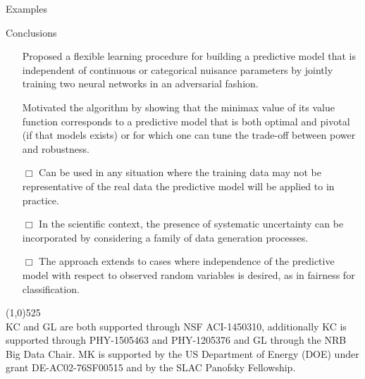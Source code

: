 \documentclass[final,unknownkeysallowed]{beamer}
\newcommand{\cmark}{\ding{51}}%
\begin{document}
\begin{frame}{}
\begin{textblock}{0.32}
\begin{block}{Examples \phantom{p}}
\end{block}

\vspace{0.5cm}
\begin{block}{Conclusions \phantom{p}}

\begin{itemize}
\item[{\color{green} \cmark}] Proposed a flexible learning procedure {\color{red}for building a
predictive model that is independent of continuous or categorical nuisance
parameters} by jointly training two neural networks in an adversarial fashion.

\item[{\color{green} \cmark}] Motivated the algorithm by showing
that the minimax value  of its value function corresponds to a predictive model
that is both optimal and pivotal (if that models exists) or for which one can
tune the trade-off between power and robustness.

\end{itemize}

\begin{itemize}
\item[{\color{blue} $\Box$}] Can be used in any situation
where the training data may not be representative of the real data the
predictive model will be applied to in practice.

\item[{\color{blue} $\Box$}] In the scientific context, the
presence of systematic uncertainty can be incorporated by considering a family
of data generation processes.

\item[{\color{blue} $\Box$}] The approach extends to cases where independence of the predictive model with respect to
observed random variables is desired, {\color{red}as in fairness for
classification}.
\end{itemize}


\line(1,0){525}\\
KC and GL are both supported through NSF ACI-1450310, additionally KC is supported through PHY-1505463 and PHY-1205376 and GL through the NRB Big Data Chair. MK is supported by the US Department of Energy (DOE) under grant DE-AC02-76SF00515 and by the SLAC Panofsky Fellowship.
\end{block}




\end{textblock}




\end{frame}
\end{document}
